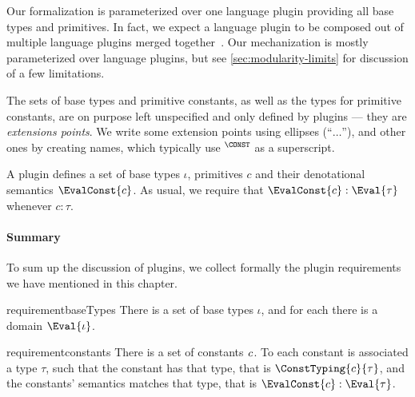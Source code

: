 Our formalization is parameterized over one language plugin
providing all base types and primitives. In fact, we expect a
language plugin to be composed out of multiple language plugins
merged together~\citep{ErdwegGR12}. Our mechanization is mostly
parameterized over language plugins, but see
\cref{sec:modularity-limits} for discussion of a few limitations.

The sets of base types and primitive
constants, as well as the types for primitive constants, are
on purpose left unspecified and only defined by plugins ---
they are \emph{extensions points}.
%
We write some extension points using ellipses (``$\ldots$''), and
other ones by creating names, which typically use $^\CONST$ as a
superscript.

A plugin defines a set of base types $\iota$, primitives $c$ and
their denotational semantics $\EvalConst{c}$. As usual, we
require that $\EvalConst{c}: \Eval{\tau}$ whenever $c : \tau$.

\paragraph{Summary}
To sum up the discussion of plugins, we collect formally the plugin requirements we have
mentioned in this chapter.
\begin{restatable}{requirement}{baseTypes}
  \label{req:base-types}
   There is a set of base types \ensuremath{\iota}, and for each there is a domain \ensuremath{\Eval{\iota}}.
\end{restatable}
\begin{restatable}[Constants]{requirement}{constants}
  \label{req:constants}
  There is a set of constants \ensuremath{\Varid{c}}. To each constant is associated
  a type \ensuremath{\tau}, such that the constant has that type, that is
  $\ConstTyping{c}{\tau}$, and the constants' semantics matches
  that type, that is $\EvalConst{c}: \Eval{\tau}$.
\end{restatable}



